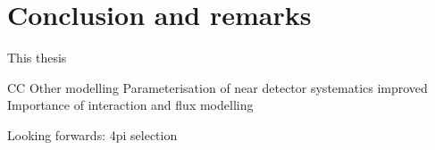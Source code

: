 \chapter{Conclusion and remarks}
\label{chap:conclusion}
This thesis

CC Other modelling
Parameterisation of near detector systematics improved
Importance of interaction and flux modelling

Looking forwards: 4pi selection